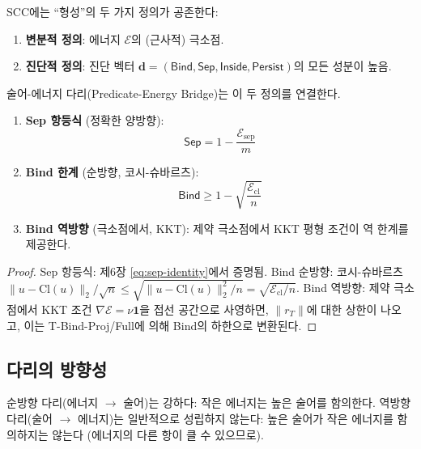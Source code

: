 SCC에는 ``형성''의 두 가지 정의가 공존한다:
\begin{enumerate}
    \item \textbf{변분적 정의}: 에너지 $\mathcal{E}$의 (근사적) 극소점.
    \item \textbf{진단적 정의}: 진단 벡터 $\mathbf{d} = (\mathsf{Bind}, \mathsf{Sep}, \mathsf{Inside}, \mathsf{Persist})$의 모든 성분이 높음.
\end{enumerate}

술어-에너지 다리(Predicate-Energy Bridge)는 이 두 정의를 연결한다.

\begin{theorem}
\label{thm:predicate-bridge}
\begin{enumerate}
    \item \textbf{Sep 항등식} (정확한 양방향):
    \begin{equation}
        \mathsf{Sep} = 1 - \frac{\mathcal{E}_{\mathrm{sep}}}{m}
    \end{equation}

    \item \textbf{Bind 한계} (순방향, 코시-슈바르츠):
    \begin{equation}
        \mathsf{Bind} \geq 1 - \sqrt{\frac{\mathcal{E}_{\mathrm{cl}}}{n}}
    \end{equation}

    \item \textbf{Bind 역방향} (극소점에서, KKT):
    제약 극소점에서 KKT 평형 조건이 역 한계를 제공한다.
\end{enumerate}
\end{theorem}

\begin{proof}
Sep 항등식: 제6장 \eqref{eq:sep-identity}에서 증명됨. Bind 순방향: 코시-슈바르츠 $\|u - \mathrm{Cl}(u)\|_2 / \sqrt{n} \leq \sqrt{\|u - \mathrm{Cl}(u)\|_2^2 / n} = \sqrt{\mathcal{E}_{\mathrm{cl}} / n}$. Bind 역방향: 제약 극소점에서 KKT 조건 $\nabla \mathcal{E} = \nu \mathbf{1}$을 접선 공간으로 사영하면, $\|r_T\|$에 대한 상한이 나오고, 이는 T-Bind-Proj/Full에 의해 Bind의 하한으로 변환된다.
\end{proof}

\subsection{다리의 방향성}

순방향 다리(에너지 $\to$ 술어)는 강하다: 작은 에너지는 높은 술어를 함의한다. 역방향 다리(술어 $\to$ 에너지)는 일반적으로 성립하지 않는다: 높은 술어가 작은 에너지를 함의하지는 않는다 (에너지의 다른 항이 클 수 있으므로).

